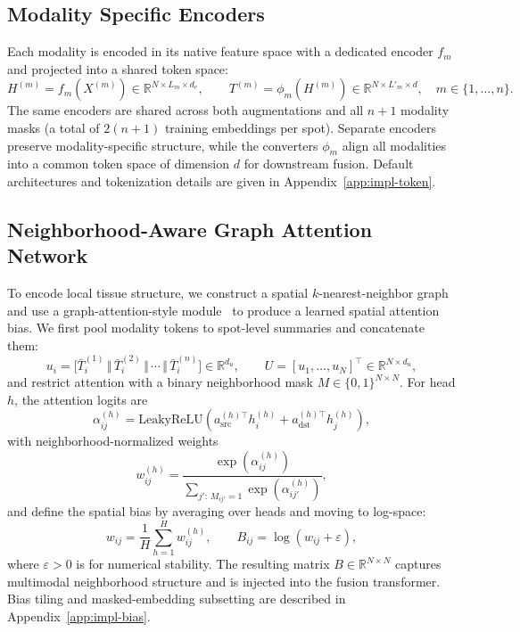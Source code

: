 \documentclass{article}
\theoremstyle{plain}
\theoremstyle{definition}
\begin{document}
\subsection{Modality Specific Encoders}
\label{subsec:modality-encoders}
Each modality is encoded in its native feature space with a dedicated encoder $f_m$ and projected into a shared token space:
\begin{equation}
  H^{(m)} = f_m(X^{(m)}) \in \mathbb{R}^{N \times L_m \times d_e},
  \qquad
  T^{(m)} = \phi_m(H^{(m)}) \in \mathbb{R}^{N \times L'_m \times d},
  \quad m \in \{1, \ldots, n\}.
\end{equation}
The same encoders are shared across both augmentations and all $n+1$ modality masks (a total of $2(n+1)$ training embeddings per spot). Separate encoders preserve modality-specific structure, while the converters $\phi_m$ align all modalities into a common token space of dimension $d$ for downstream fusion. Default architectures and tokenization details are given in Appendix~\ref{app:impl-token}.

\subsection{Neighborhood-Aware Graph Attention Network}
\label{subsec:neighgat}

To encode local tissue structure, we construct a spatial $k$-nearest-neighbor graph and use a graph-attention-style module~\cite{velivckovic2018gat} to produce a learned spatial attention bias. We first pool modality tokens to spot-level summaries and concatenate them:
\begin{equation}
  u_i = \bigl[\bar T^{(1)}_i \,\Vert\, \bar T^{(2)}_i \,\Vert\, \cdots \,\Vert\, \bar T^{(n)}_i\bigr] \in \mathbb{R}^{d_u},
  \qquad
  U = [u_1,\dots,u_N]^\top \in \mathbb{R}^{N \times d_u},
\end{equation}
and restrict attention with a binary neighborhood mask $M \in \{0,1\}^{N \times N}$. For head $h$, the attention logits are
\begin{equation}
  \alpha_{ij}^{(h)}
  = \mathrm{LeakyReLU}\!\left(
    a_{\mathrm{src}}^{(h)\top} h_i^{(h)}
    + a_{\mathrm{dst}}^{(h)\top} h_j^{(h)}
  \right),
\end{equation}
with neighborhood-normalized weights
\begin{equation}
  w_{ij}^{(h)}
  =
  \frac{\exp(\alpha_{ij}^{(h)})}
  {\sum_{j':\,M_{ij'}=1} \exp(\alpha_{ij'}^{(h)})},
\end{equation}
and define the spatial bias by averaging over heads and moving to log-space:
\begin{equation}
  w_{ij} = \frac{1}{H}\sum_{h=1}^H w_{ij}^{(h)},
  \qquad
  B_{ij} = \log(w_{ij} + \varepsilon),
\end{equation}
where $\varepsilon > 0$ is for numerical stability. The resulting matrix $B \in \mathbb{R}^{N \times N}$ captures multimodal neighborhood structure and is injected into the fusion transformer. Bias tiling and masked-embedding subsetting are described in Appendix~\ref{app:impl-bias}.
\end{document}
